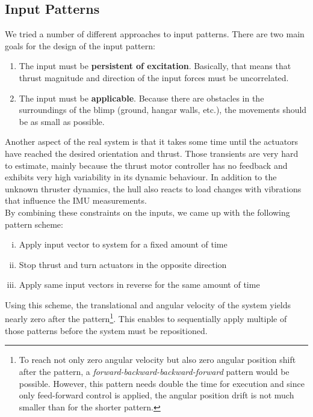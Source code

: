\subsection{Input Patterns}
\label{sub:input_pattern}
We tried a number of different approaches to input patterns.
There are two main goals for the design of the input pattern:
\begin{enumerate}
\item The input must be \textbf{persistent of excitation}. Basically, that means that thrust magnitude and direction of the input forces must be uncorrelated.
\item The input must be \textbf{applicable}. Because there are obstacles in the surroundings of the blimp (ground, hangar walls, etc.), the movements should be as small as possible.
\end{enumerate}

Another aspect of the real system is that it takes some time until the actuators have reached the desired orientation and thrust.
Those transients are very hard to estimate, mainly because the thrust motor controller has no feedback and exhibits very high variability in its dynamic behaviour.
In addition to the unknown thruster dynamics, the hull also reacts to load changes with vibrations that influence the IMU measurements. \\

By combining these constraints on the inputs, we came up with the following pattern scheme:
\begin{enumerate}[(i)]
\item Apply input vector to system for a fixed amount of time
\item Stop thrust and turn actuators in the opposite direction
\item Apply same input vectors in reverse for the same amount of time
\end{enumerate}
Using this scheme, the translational and angular velocity of the system yields nearly zero after the pattern\footnote{To reach not only zero angular velocity but also zero angular position shift after the pattern, a \textit{forward-backward-backward-forward} pattern would be possible. However, this pattern needs double the time for execution and since only feed-forward control is applied, the angular position drift is not much smaller than for the shorter pattern.
}.
This enables to sequentially apply multiple of those patterns before the system must be repositioned.
\\

